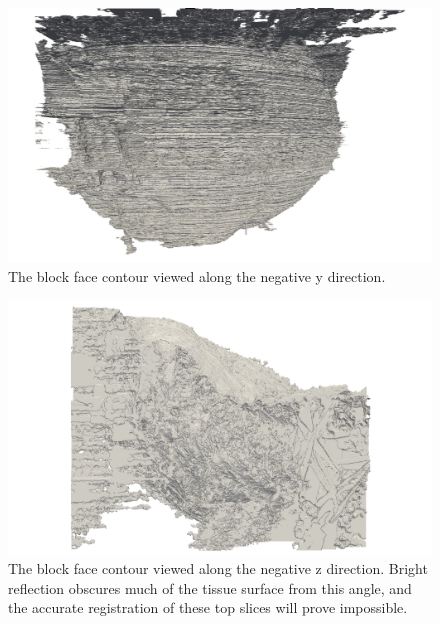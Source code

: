   \begin{figure}
    \centering
    \includegraphics[width=\textheight]{Ch5/Figs/Rat28/contours/LoRes_negative_y}
    \caption{The block face contour viewed along the negative y direction.}
    \label{fig:LoRes_negative_y}
  \end{figure}
  
  \begin{figure}
    \centering
    \includegraphics[width=\textheight]{Ch5/Figs/Rat28/contours/LoRes_negative_z}
    \caption{The block face contour viewed along the negative z direction. Bright reflection obscures much of the tissue surface from this angle, and the accurate registration of these top slices will prove impossible.}
    \label{fig:LoRes_negative_z}
  \end{figure}
  
